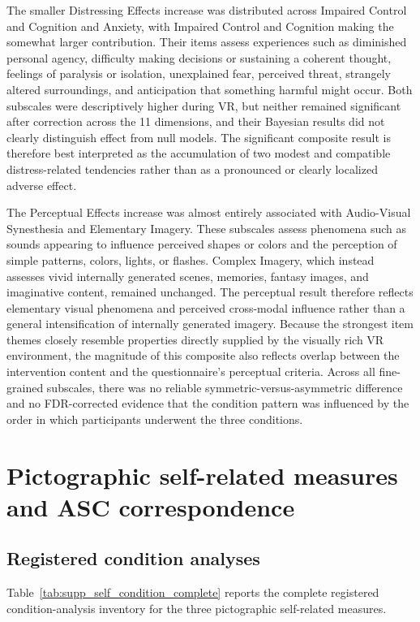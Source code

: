 \documentclass[pdflatex,sn-basic,lineno]{../sn-jnl}
\begin{document}
The smaller Distressing Effects increase was distributed across Impaired Control and Cognition and Anxiety, with Impaired Control and Cognition making the somewhat larger contribution. Their items assess experiences such as diminished personal agency, difficulty making decisions or sustaining a coherent thought, feelings of paralysis or isolation, unexplained fear, perceived threat, strangely altered surroundings, and anticipation that something harmful might occur. Both subscales were descriptively higher during VR, but neither remained significant after correction across the 11 dimensions, and their Bayesian results did not clearly distinguish effect from null models. The significant composite result is therefore best interpreted as the accumulation of two modest and compatible distress-related tendencies rather than as a pronounced or clearly localized adverse effect.

The Perceptual Effects increase was almost entirely associated with Audio-Visual Synesthesia and Elementary Imagery. These subscales assess phenomena such as sounds appearing to influence perceived shapes or colors and the perception of simple patterns, colors, lights, or flashes. Complex Imagery, which instead assesses vivid internally generated scenes, memories, fantasy images, and imaginative content, remained unchanged. The perceptual result therefore reflects elementary visual phenomena and perceived cross-modal influence rather than a general intensification of internally generated imagery. Because the strongest item themes closely resemble properties directly supplied by the visually rich VR environment, the magnitude of this composite also reflects overlap between the intervention content and the questionnaire's perceptual criteria. Across all fine-grained subscales, there was no reliable symmetric-versus-asymmetric difference and no FDR-corrected evidence that the condition pattern was influenced by the order in which participants underwent the three conditions.

\section{Pictographic self-related measures and ASC correspondence}
\label{sec:supp_pictograph_asc}

\subsection{Registered condition analyses}

Table~\ref{tab:supp_self_condition_complete} reports the complete registered condition-analysis inventory for the three pictographic self-related measures.
\end{document}
